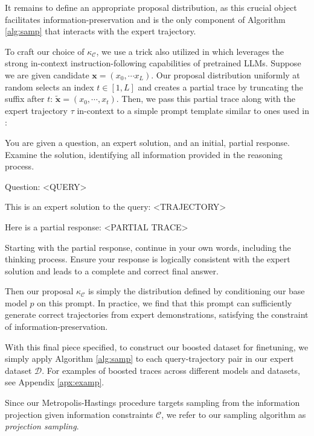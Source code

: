 \documentclass{article}
\begin{document}
 It remains to define an appropriate proposal distribution, as this crucial object facilitates information-preservation and is the only component of Algorithm \ref{alg:samp} that interacts with the expert trajectory. 
 
 To craft our choice of $\kappa_{\mathcal{C}}$, we use a  trick also utilized in \cite{qu2026pope, shenfeld2026self} which leverages the strong in-context instruction-following capabilities of pretrained LLMs. Suppose we are given candidate $\mathbf{x} = (x_0, \cdots x_L)$. Our proposal distribution uniformly at random selects an index $t \in [1, L]$ and creates a partial trace by truncating the suffix after $t$: $\tilde{\mathbf{x}} = (x_0, \cdots, x_t)$. Then, we pass this partial trace along with the expert trajectory $\tau$ in-context to a simple prompt template similar to ones used in \cite{qu2026pope}:
\begin{promptbox}
You are given a question, an expert solution, and an initial, partial response. Examine the solution, identifying all information provided in the reasoning process. 

\bigskip

Question: <QUERY>

\bigskip

This is an expert solution to the query: <TRAJECTORY>

\bigskip


Here is a partial response: <PARTIAL TRACE>

\bigskip


Starting with the partial response, continue in your own words, including the thinking process. Ensure your response is logically consistent with the expert solution and leads to a complete and correct final answer.
\end{promptbox}

Then our proposal $\kappa_{\mathcal{C}}$ is simply the  distribution defined by conditioning our base model $p$ on this prompt. In practice, we find that this prompt can sufficiently generate correct trajectories from expert demonstrations, satisfying the constraint of information-preservation. 

With this final piece specified, to construct our boosted dataset for finetuning, we simply apply Algorithm \ref{alg:samp} to each query-trajectory pair in our expert dataset $\mathcal{D}$. For examples of boosted traces across different models and datasets, see Appendix \ref{apx:examp}.

Since our Metropolis-Hastings procedure targets sampling from the information projection given information constraints $\mathcal{C}$, we refer to our sampling algorithm as \textit{projection sampling}. 
\end{document}

